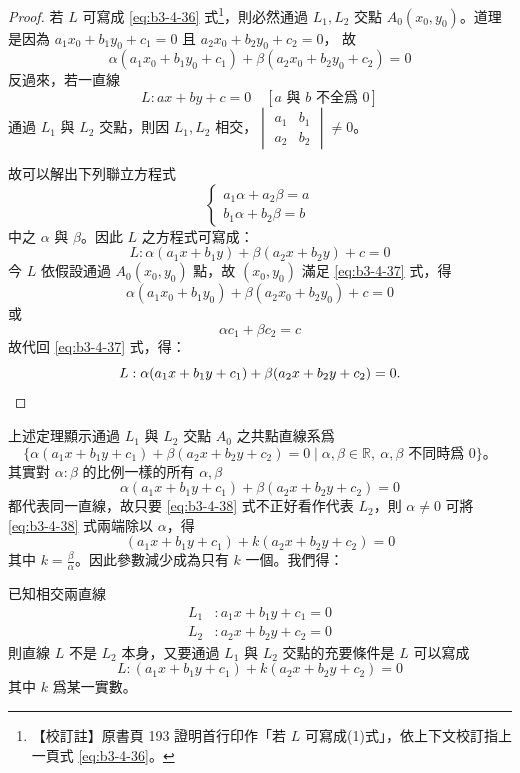 \begin{proof}
若 $L$ 可寫成 \eqref{eq:b3-4-36} 式\footnote{\label{note:b3-ch4-p193-formula-ref}【校訂註】原書頁 193 證明首行印作「若 $L$ 可寫成(1)式」，依上下文校訂指上一頁式 \eqref{eq:b3-4-36}。}，則必然通過 $L_1, L_2$ 交點 $A_0(x_0, y_0)$。道理是因為 $a_1 x_0 + b_1 y_0 + c_1 = 0$ 且 $a_2 x_0 + b_2 y_0 + c_2 = 0$，
故
\[
\alpha(a_1 x_0 + b_1 y_0 + c_1) + \beta(a_2 x_0 + b_2 y_0 + c_2) = 0
\]
反過來，若一直線
\[
L : ax + by + c = 0 \quad [a \text{ 與 } b \text{ 不全爲 } 0]
\]
通過 $L_1$ 與 $L_2$ 交點，則因 $L_1, L_2$ 相交，$\begin{vmatrix} a_1 & b_1 \\ a_2 & b_2 \end{vmatrix} \neq 0$。

故可以解出下列聯立方程式
\[
\begin{cases}
a_1 \alpha + a_2 \beta = a \\
b_1 \alpha + b_2 \beta = b
\end{cases}
\]
中之 $\alpha$ 與 $\beta$。因此 $L$ 之方程式可寫成：
\begin{equation}
L : \alpha(a_1 x + b_1 y) + \beta(a_2 x + b_2 y) + c = 0
\label{eq:b3-4-37}
\end{equation}
今 $L$ 依假設通過 $A_0(x_0, y_0)$ 點，故 $(x_0, y_0)$ 滿足 \eqref{eq:b3-4-37} 式，得
\[
\alpha(a_1 x_0 + b_1 y_0) + \beta(a_2 x_0 + b_2 y_0) + c = 0
\]
或
\[
\alpha c_1 + \beta c_2 = c
\]
故代回 \eqref{eq:b3-4-37} 式，得：
\[
L : \alpha(a_1 x + b_1 y + c_1) + \beta(a_2 x + b_2 y + c_2) = 0. \qedhere
\]
\end{proof}

上述定理顯示通過 $L_1$ 與 $L_2$ 交點 $A_0$ 之共點直線系爲
\[
\{\alpha(a_1 x + b_1 y + c_1) + \beta(a_2 x + b_2 y + c_2) = 0 \mid \alpha, \beta \in \mathbb{R},\ \alpha, \beta \text{ 不同時爲 } 0\}\text{。}
\]
其實對 $\alpha : \beta$ 的比例一樣的所有 $\alpha, \beta$
\begin{equation}
\alpha(a_1 x + b_1 y + c_1) + \beta(a_2 x + b_2 y + c_2) = 0
\label{eq:b3-4-38}
\end{equation}
都代表同一直線，故只要 \eqref{eq:b3-4-38} 式不正好看作代表 $L_2$，則 $\alpha \neq 0$ 可將 \eqref{eq:b3-4-38} 式兩端除以 $\alpha$，得
\[
(a_1 x + b_1 y + c_1) + k(a_2 x + b_2 y + c_2) = 0
\]
其中 $k = \frac{\beta}{\alpha}$。因此參數減少成為只有 $k$ 一個。我們得：

\begin{theorem}
已知相交兩直線
\begin{align*}
L_1 &: a_1 x + b_1 y + c_1 = 0 \\
L_2 &: a_2 x + b_2 y + c_2 = 0
\end{align*}
則直線 $L$ 不是 $L_2$ 本身，又要通過 $L_1$ 與 $L_2$ 交點的充要條件是 $L$ 可以寫成
\[
L : (a_1 x + b_1 y + c_1) + k(a_2 x + b_2 y + c_2) = 0
\]
其中 $k$ 爲某一實數。
\end{theorem}

